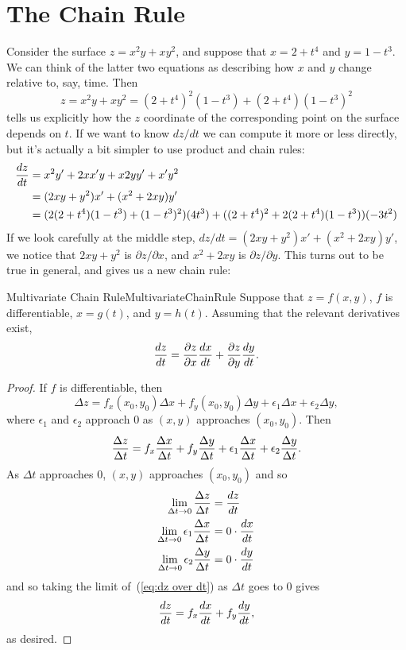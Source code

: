 \section{The Chain Rule}\label{sec:multivariable chain rules}

Consider the surface $z=x^2y+xy^2$, and suppose that 
$x=2+t^4$ and $y=1-t^3$. We can think of the latter two equations as
describing how $x$ and $y$ change relative to, say, time. Then
$$z=x^2y+xy^2=(2+t^4)^2(1-t^3)+(2+t^4)(1-t^3)^2$$ 
tells us explicitly how the $z$ coordinate of the corresponding point on the
surface depends on $t$. If we want to know $dz/dt$ we can compute it
more or less directly, but it's actually a bit simpler to use product and chain
rules:
\begin{align*}
  {dz\over dt}&=x^2y'+2xx'y+x2yy'+x'y^2	\\
  &=(2xy+y^2)x'+(x^2+2xy)y'	\\
  &=(2(2+t^4)(1-t^3)+(1-t^3)^2)(4t^3)+((2+t^4)^2+2(2+t^4)(1-t^3))(-3t^2)	\\
\end{align*}
If we look carefully at the middle step,
$dz/dt=(2xy+y^2)x'+(x^2+2xy)y'$, we notice that $2xy+y^2$ is $\partial
z/\partial x$, and $x^2+2xy$ is $\partial z/\partial y$.
This turns out to be true in general, and gives us a new chain rule:

\begin{theorem}{Multivariate Chain Rule}{MultivariateChainRule}
Suppose that $z=f(x,y)$, $f$ is differentiable,
$x=g(t)$, and $y=h(t)$.
Assuming that the relevant derivatives exist, 
$${dz\over dt}={\partial z\over \partial x}{dx\over dt}+
{\partial z\over \partial y}{dy\over dt}.
$$
\end{theorem}
\begin{proof}
If $f$ is differentiable, then 
$$\Delta z=f_x(x_0,y_0)\Delta x+f_y(x_0,y_0)\Delta y+\epsilon_1\Delta
x + \epsilon_2\Delta y,$$
where $\epsilon_1$ and $\epsilon_2$ approach 0 as 
$(x,y)$ approaches $(x_0,y_0)$. Then
\begin{equation}\label{eq:dz over dt}
{\Delta z\over\Delta t}=
f_x{\Delta x\over\Delta t}+f_y{\Delta y\over\Delta t}+\epsilon_1{\Delta
x\over\Delta t} + \epsilon_2{\Delta y\over\Delta t}.
\end{equation}
As $\Delta t$ approaches 0, $(x,y)$ approaches $(x_0,y_0)$ and so
\begin{align*}
\lim_{\Delta t\to0}{\Delta z\over\Delta t} &=  {dz\over dt}	\\
\lim_{\Delta t\to0}\epsilon_1{\Delta x\over\Delta t} &= 0\cdot{dx\over dt}	\\
\lim_{\Delta t\to0}\epsilon_2{\Delta y\over\Delta t} &= 0\cdot{dy\over dt}	\\
\end{align*}
and so taking the limit of~(\ref{eq:dz over dt})
 as $\Delta t$ goes to 0 gives 
$$
{dz\over dt}=
f_x{dx\over dt}+f_y{dy\over dt},
$$
as desired.
\end{proof}

